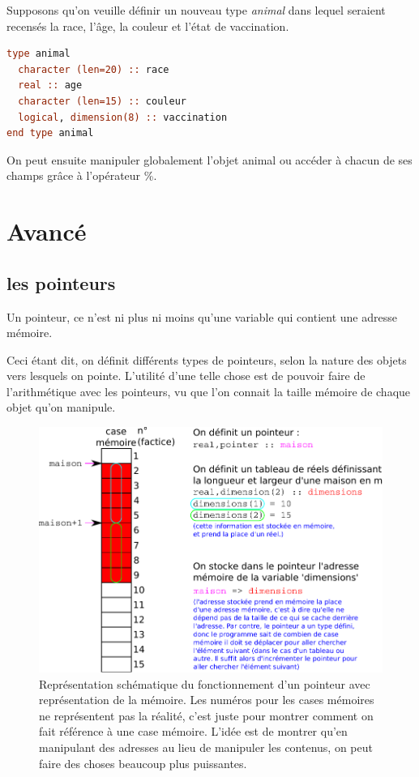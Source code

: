 \documentclass[a4paper,twoside]{article}
\begin{document}
\bigskip

\begin{exemple}
Supposons qu'on veuille définir un nouveau type \textit{animal} dans lequel seraient recensés la race, l'âge, la couleur et l'état de vaccination.
\begin{lstlisting}[language=Fortran]
type animal
  character (len=20) :: race
  real :: age
  character (len=15) :: couleur
  logical, dimension(8) :: vaccination
end type animal
\end{lstlisting}

On peut ensuite manipuler globalement l'objet animal ou accéder à chacun de ses champs grâce à l'opérateur \og \%\fg.

\end{exemple}


\section{Avancé}
\subsection{les pointeurs}
Un pointeur, ce n'est ni plus ni moins qu'une variable qui contient une adresse mémoire. 

Ceci étant dit, on définit différents types de pointeurs, selon la nature des objets vers lesquels on pointe. L'utilité d'une telle chose est de pouvoir faire de l'arithmétique avec les pointeurs, vu que l'on connait la taille mémoire de chaque objet qu'on manipule. 

\begin{figure}[htb]
\centering
\includegraphics[width=0.65\linewidth]{figure/pointeurs.pdf}
\caption{Représentation schématique du fonctionnement d'un pointeur avec représentation de la mémoire. Les numéros pour les cases mémoires ne représentent pas la réalité, c'est juste pour montrer comment on fait référence à une case mémoire. L'idée est de montrer qu'en manipulant des adresses au lieu de manipuler les contenus, on peut faire des choses beaucoup plus puissantes.}
\end{figure}
\end{document}
